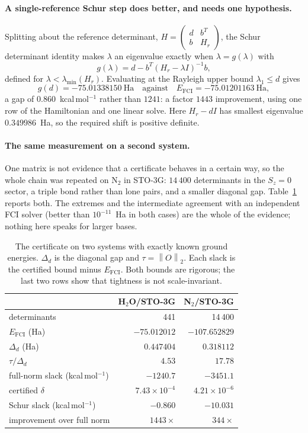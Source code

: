 \documentclass[11pt,a4paper]{article}
\theoremstyle{plain}
\theoremstyle{definition}
\theoremstyle{remark}
\newcommand{\norm}[1]{\left\lVert #1\right\rVert}
\begin{document}
\paragraph{A single-reference Schur step does better, and needs one hypothesis.}
Splitting about the reference determinant, $H = \begin{pmatrix} d & b^T\\
b & H_r\end{pmatrix}$, the Schur determinant identity makes $\lambda$ an
eigenvalue exactly when $\lambda = g(\lambda)$ with
\[
  g(\lambda) = d - b^T (H_r-\lambda I)^{-1} b ,
\]
defined for $\lambda<\lambda_{\min}(H_r)$. Evaluating at the Rayleigh upper bound
$\lambda_1\le d$ gives
\[
  g(d) = -75.01338150\ \text{Ha}
  \quad\text{against}\quad
  E_{\mathrm{FCI}} = -75.01201163\ \text{Ha},
\]
a gap of $0.860$~kcal\,mol$^{-1}$ rather than $1241$: a factor $1443$ improvement,
using one row of the Hamiltonian and one linear solve. Here
$H_r-dI$ has smallest eigenvalue $0.349986$~Ha, so the required shift is positive
definite.

\paragraph{The same measurement on a second system.}
One matrix is not evidence that a certificate behaves in a certain way, so the
whole chain was repeated on N$_2$ in STO-3G: $14\,400$ determinants in the
$S_z=0$ sector, a triple bond rather than lone pairs, and a smaller diagonal gap.
Table~\ref{tab:two-systems} reports both. The extremes and the intermediate
agreement with an independent FCI solver (better than $10^{-11}$~Ha in both
cases) are the whole of the evidence; nothing here speaks for larger bases.

\begin{table}[t]
\centering
\caption{The certificate on two systems with exactly known ground energies.
$\Delta_d$ is the diagonal gap and $\tau=\norm O_2$. Each slack is the certified
bound minus $E_{\mathrm{FCI}}$. Both bounds are rigorous; the last two rows show
that tightness is not scale-invariant.}
\label{tab:two-systems}
\begin{tabular}{lrr}
\hline
 & H$_2$O/STO-3G & N$_2$/STO-3G\\
\hline
determinants               & 441      & 14\,400\\
$E_{\mathrm{FCI}}$ (Ha)    & $-75.012012$ & $-107.652829$\\
$\Delta_d$ (Ha)            & $0.447404$ & $0.318112$\\
$\tau/\Delta_d$            & $4.53$   & $17.78$\\
full-norm slack (kcal\,mol$^{-1}$) & $-1240.7$ & $-3451.1$\\
certified $\delta$         & $7.43\times10^{-4}$ & $4.21\times10^{-6}$\\
Schur slack (kcal\,mol$^{-1}$) & $-0.860$ & $-10.031$\\
improvement over full norm & $1443\times$ & $344\times$\\
\hline
\end{tabular}
\end{table}
\end{document}
